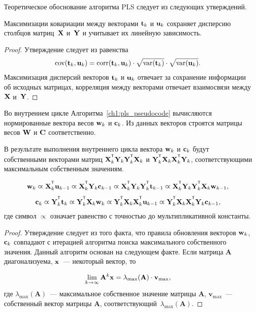 Теоретическое обоснование алгоритма PLS следует из следующих утверждений.
\begin{statement}
	Максимизации ковариации между векторами $\mathbf{t}_k$ и $\mathbf{u}_k$ сохраняет дисперсию столбцов матриц~$\mathbf{X}$ и~$\mathbf{Y}$ и учитывает их линейную зависимость.
\end{statement}
\begin{proof}
	Утверждение следует из равенства
	\[
	\text{cov} (\mathbf{t}_k, \mathbf{u}_k) = \text{corr} (\mathbf{t}_k, \mathbf{u}_k) \cdot \sqrt{\text{var}(\mathbf{t}_k)} \cdot \sqrt{\text{var}(\mathbf{u}_k)}.
	\]
	Максимизация дисперсий векторов $\mathbf{t}_k$ и $\mathbf{u}_k$ отвечает за сохранение информации об исходных матрицах, 
	корреляция между векторами отвечает взаимосвязи между $\mathbf{X}$ и~$\mathbf{Y}$. 
\end{proof}

Во внутреннем цикле Алгоритма~\ref{ch1:pls_pseudocode} вычисляются нормированные вектора весов $\mathbf{w}_k$ и $\mathbf{c}_k$. 
Из данных векторов строятся матрицы весов $\mathbf{W}$ и $\mathbf{C}$ соответственно.

\begin{statement}
	В результате выполнения внутреннего цикла вектора $\mathbf{w}_k$ и $\mathbf{c}_k$ будут собственными векторами матриц $\bX_k^{\T} \bY_k \bY_k^{\T} \bX_k$ и $\bY_k^{\T} \bX_k \bX_k^{\T} \bY_k$, соответствующими максимальным собственным значениям.
	
	\begin{equation*}
		\bw_k \varpropto \bX_k^{\T} \bu_{k-1} \varpropto \bX_k^{\T} \bY_k \bc_{k-1} \varpropto \bX_k^{\T} \bY_k \bY_k^{\T} \bt_{k-1} \varpropto \bX_k^{\T} \bY_k \bY_k^{\T} \bX_k \bw_{k-1},
	\end{equation*}
	\begin{equation*}
		\bc_k \varpropto \bY_k^{\T} \bt_k \varpropto \bY_k^{\T} \bX_k \bw_k \varpropto \bY_k^{\T} \bX_k \bX_k^{\T} \bu_{k-1} \varpropto \bY_k^{\T} \bX_k \bX_k^{\T} \bY_k \bc_{k-1},
	\end{equation*}
	где символ $\varpropto$ означает равенство с точностью до мультипликативной константы. 
	\label{st:eig}
\end{statement}
\begin{proof}
	Утверждение следует из того факта, что правила обновления векторов $\mathbf{w}_k$, $\mathbf{c}_k$ совпадают с итерацией алгоритма поиска максимального собственного значения. 
	Данный алгоритм основан на следующем факте.
	Если матрица $\mathbf{A}$ диагонализуема, $\mathbf{x}$~--- некоторый вектор, то
	
	\[
	\lim_{k \rightarrow \infty} \mathbf{A}^k \mathbf{x} = \lambda_{\max}(\mathbf{A}) \cdot \mathbf{v}_{\max},
	\]
	где $ \lambda_{\max} (\mathbf{A})$~--- максимальное собственное значение матрицы $\mathbf{A}$, $\mathbf{v}_{\max}$~---собственный вектор матрицы $\mathbf{A}$, соответствующий~$\lambda_{\max} (\mathbf{A})$.
	
\end{proof}

